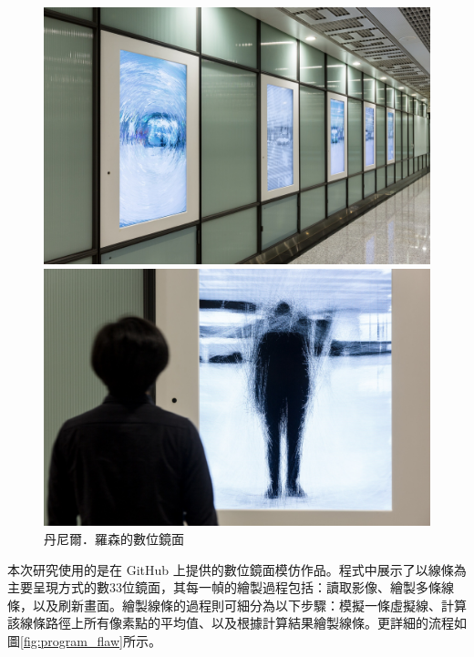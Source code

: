 \documentclass[12pt]{article}
\begin{document}
\begin{figure}[htbp]
  \centering
  \begin{minipage}[b]{0.45\textwidth}
    \centering
    \includegraphics[width=\textwidth]{img/mirror_example_2.jpg}
  \end{minipage}
  \hfill
  \begin{minipage}[b]{0.45\textwidth}
    \centering
    \includegraphics[width=\textwidth]{img/mirror_example_3.jpg}
  \end{minipage}
\caption{丹尼爾．羅森的數位鏡面}\label{fig:mirror_example_23}
\end{figure}

本次研究使用的是\textcite{github_mirror}在 GitHub 上提供的數位鏡面模仿作品。程式中展示了以線條為主要呈現方式的數33位鏡面，其每一幀的繪製過程包括：讀取影像、繪製多條線條，以及刷新畫面。繪製線條的過程則可細分為以下步驟：模擬一條虛擬線、計算該線條路徑上所有像素點的平均值、以及根據計算結果繪製線條。更詳細的流程如圖\ref{fig:program_flaw}所示。
\end{document}
